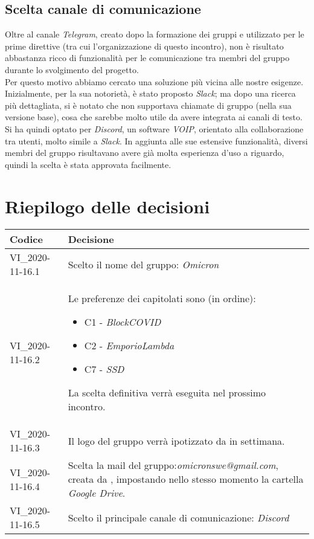 \documentclass[12pt]{article}
\begin{document}
	\subsection{Scelta canale di comunicazione}
	Oltre al canale \textit{Telegram}, creato dopo la formazione dei gruppi e utilizzato per le prime direttive (tra cui l'organizzazione di questo incontro), non è risultato abbastanza ricco di funzionalità per le comunicazione tra membri del gruppo durante lo svolgimento del progetto.\\
	Per questo motivo abbiamo cercato una soluzione più vicina alle nostre esigenze.\\
	Inizialmente, per la sua notorietà, è stato proposto \textit{Slack}; ma dopo una ricerca più dettagliata, si è notato che non supportava chiamate di gruppo (nella sua versione base), cosa che sarebbe molto utile da avere integrata ai canali di testo.\\
	Si ha quindi optato per \textit{Discord}, un software \textit{VOIP}, orientato alla collaborazione tra utenti, molto simile a \textit{Slack}. In aggiunta alle sue estensive funzionalità, diversi membri del gruppo risultavano avere già molta esperienza d'uso a riguardo, quindi la scelta è stata approvata facilmente.
	
	\section{Riepilogo delle decisioni}
	

{

\centering
\renewcommand{\arraystretch}{1.5}
\begin{longtable}{ >{\centering}p{} >{}p{}}
\rowcolor{azzurro1}
\textbf{Codice} &
\textbf{Decisione}\\
\endhead

VI\_2020-11-16.1 & Scelto il nome del gruppo: \textit{Omicron}\\
VI\_2020-11-16.2 & Le preferenze dei capitolati sono (in ordine):
\begin{itemize}
\item C1 - \textit{BlockCOVID}
\item C2 - \textit{EmporioLambda}
\item C7 - \textit{SSD}
\end{itemize}
La scelta definitiva verrà eseguita nel prossimo incontro.\\
VI\_2020-11-16.3 & Il logo del gruppo verrà ipotizzato da \NM{} in settimana. \\
VI\_2020-11-16.4 & Scelta la mail del gruppo:\textit{omicronswe@gmail.com}, creata da \MDI{}, impostando nello stesso momento la cartella \textit{Google Drive}.\\
VI\_2020-11-16.5 & Scelto il principale canale di comunicazione: \textit{Discord}\\
		
\end{longtable}
}
\end{document}
